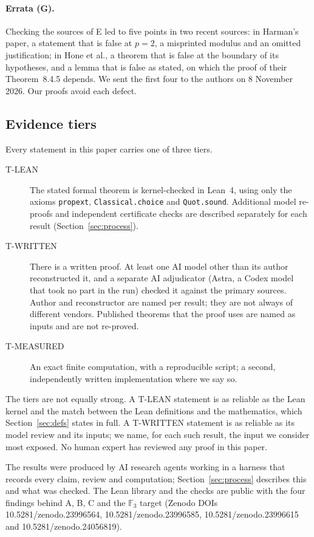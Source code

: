 \paragraph{Errata (G).}  Checking the sources of E led to five points in two recent
sources: in Harman's paper, a statement that is false at $p=2$, a misprinted modulus and an
omitted justification; in Hone et al., a theorem that is false at the boundary of its
hypotheses, and a lemma that is false as stated, on which the proof of their Theorem~8.4.5
depends.  We sent the first four to the authors on 8 November 2026.  Our proofs avoid each
defect.

\subsection{Evidence tiers}\label{sec:intro-tiers}

Every statement in this paper carries one of three tiers.
\begin{description}
\item[T-LEAN] The stated formal theorem is kernel-checked in Lean~4, using only the axioms
  \texttt{propext}, \texttt{Classical.choice} and \texttt{Quot.sound}.  Additional model
  re-proofs and independent certificate checks are described separately for each result
  (Section~\ref{sec:process}).
\item[T-WRITTEN] There is a written proof.  At least one AI model other than its author
  reconstructed it, and a separate AI adjudicator (Astra, a Codex model that took no part
  in the run) checked it against the primary sources.  Author and reconstructor are named
  per result; they are not always of different vendors.  Published theorems that the proof uses are named as
  inputs and are not re-proved.
\item[T-MEASURED] An exact finite computation, with a reproducible script; a second,
  independently written implementation where we say so.
\end{description}
The tiers are not equally strong.  A T-LEAN statement is as reliable as the Lean kernel
and the match between the Lean definitions and the mathematics, which
Section~\ref{sec:defs} states in full.  A T-WRITTEN statement is as reliable as its
model review and its inputs; we name, for each such result, the input we consider most
exposed.  No human expert has reviewed any proof in this paper.

The results were produced by AI research agents working in a harness that records every
claim, review and computation; Section~\ref{sec:process} describes this and what was
checked.  The Lean library and the checks are public with the four findings behind A, B, C and the
$\mathbb F_3$ target (Zenodo DOIs 10.5281/zenodo.23996564, 10.5281/zenodo.23996585,
10.5281/zenodo.23996615 and 10.5281/zenodo.24056819).

